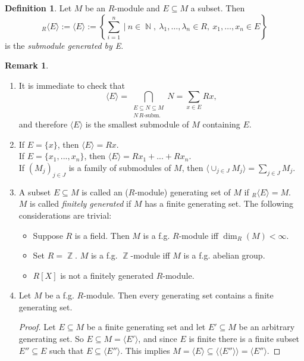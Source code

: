 \documentclass[12pt,a4paper]{report}
\theoremstyle{definition}
\newtheorem{defn}[theorem]{Definition}
\newtheorem*{remark}{Remark}
\theoremstyle{num.custom-title}
\DeclareMathOperator{\N}{\mathbb{N}}
\DeclareMathOperator{\Z}{\mathbb{Z}}
\DeclareMathOperator{\sse}{\subseteq}
\begin{document}
\begin{defn}
Let $M$ be an $R$-module and $E \sse M$ a subset. Then 
\[
{}_R \langle E \rangle := \langle E \rangle := \left\{ \sum_{i=1}^n \ \Bigg| \ n \in \N, \ \lambda_1, \ldots, \lambda_n \in R, \ x_1, \ldots, x_n \in E \right\}
\]
is the \emph{submodule generated by E}.
\end{defn}

\begin{remark}\ 
\begin{enumerate}
\item It is immediate to check that 
\[
\langle E \rangle = \bigcap_{\substack{E \sse N \sse M \\ N \, \text{$R$-subm.}}} N = \sum_{x \in E} Rx,
\]
and therefore $\langle E \rangle$ is the smallest submodule of $M$ containing $E$.
\item If $E = \{x\}$, then $\langle E \rangle = Rx$.\\ 
If $E = \{x_1,...,x_n\}$, then $\langle E \rangle = Rx_1 + ... + Rx_n$.\\
If $(M_j)_{j \in J}$ is a family of submodules of $M$, then $\langle \cup_{j \in J} M_j \rangle = \sum_{j \in J} M_j$.
\item A subset $E \sse M$ is called an ($R$-module) generating set of $M$ if ${}_R \langle E \rangle = M$.\\
$M$ is called \emph{finitely generated} if $M$ has a finite generating set. The following considerations are trivial:
\begin{itemize}
\item Suppose $R$ is a field. Then $M$ is a f.g. $R$-module iff $\dim_R(M) < \infty$.
\item Set $R=\Z$. $M$ is a f.g. $\Z$-module iff $M$ is a f.g. abelian group.
\item $R[X]$ is not a finitely generated $R$-module.
\end{itemize}
\item Let $M$ be a f.g. $R$-module. Then every generating set contains a finite generating set.
\begin{proof}
Let $E \sse M$ be a finite generating set and let $E' \sse M$ be an arbitrary generating set. So $E \sse M = \langle E' \rangle$, and since $E$ is finite there is a finite subset $E'' \sse E$ such that $E \sse \langle E'' \rangle$. This implies $M = \langle E \rangle \sse \langle \langle E'' \rangle \rangle = \langle E'' \rangle$.
\end{proof}
\end{enumerate}
\end{remark}
\end{document}

